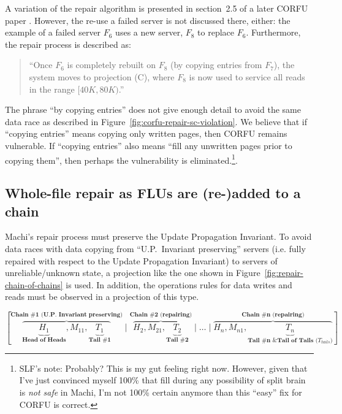 \documentclass[preprint,10pt]{sigplanconf}
\begin{document}
A variation of the repair
algorithm is presented in section~2.5 of a later CORFU paper \cite{corfu2}.
However, the re-use a failed
server is not discussed there, either: the example of a failed server
$F_6$ uses a new server, $F_8$ to replace $F_6$.  Furthermore, the
repair process is described as:

\begin{quote}
``Once $F_6$ is completely rebuilt on $F_8$ (by copying entries from
  $F_7$), the system moves to projection (C), where $F_8$ is now used
  to service all reads in the range $[40K,80K)$.''
\end{quote}

The phrase ``by copying entries'' does not give enough
detail to avoid the same data race as described in
Figure~\ref{fig:corfu-repair-sc-violation}.  We believe that if
``copying entries'' means copying only written pages, then CORFU
remains vulnerable.  If ``copying entries'' also means ``fill any
unwritten pages prior to copying them'', then perhaps the
vulnerability is eliminated.\footnote{SLF's note: Probably?  This is my
  gut feeling right now.  However, given that I've just convinced
  myself 100\% that fill during any possibility of split brain is {\em
  not safe} in Machi, I'm not 100\% certain anymore than this ``easy''
  fix for CORFU is correct.}.

\subsection{Whole-file repair as FLUs are (re-)added to a chain}
\label{sub:repair-add-to-chain}

Machi's repair process must preserve the Update Propagation
Invariant.  To avoid data races with data copying from
``U.P.~Invariant preserving'' servers (i.e. fully repaired with
respect to the Update Propagation Invariant)
to servers of unreliable/unknown state, a
projection like the one shown in
Figure~\ref{fig:repair-chain-of-chains} is used.  In addition, the
operations rules for data writes and reads must be observed in a
projection of this type.

\begin{figure*}
\centering
$
[\overbrace{\underbrace{H_1}_\textbf{Head of Heads}, M_{11},
      \underbrace{T_1}_\textbf{Tail \#1}}^\textbf{Chain \#1 (U.P.~Invariant preserving)}
\mid
\overbrace{H_2, M_{21},
      \underbrace{T_2}_\textbf{Tail \#2}}^\textbf{Chain \#2 (repairing)}
\mid \ldots \mid
\overbrace{H_n, M_{n1},
      \underbrace{T_n}_\textbf{Tail \#n \& Tail of Tails ($T_{tails}$)}}^\textbf{Chain \#n (repairing)}
]
$
\caption{Representation of a ``chain of chains'': a chain prefix of
  Update Propagation Invariant preserving FLUs (``Chain \#1'')
  with FLUs from $n-1$ other chains under repair.}
\label{fig:repair-chain-of-chains}
\end{figure*}
\end{document}
